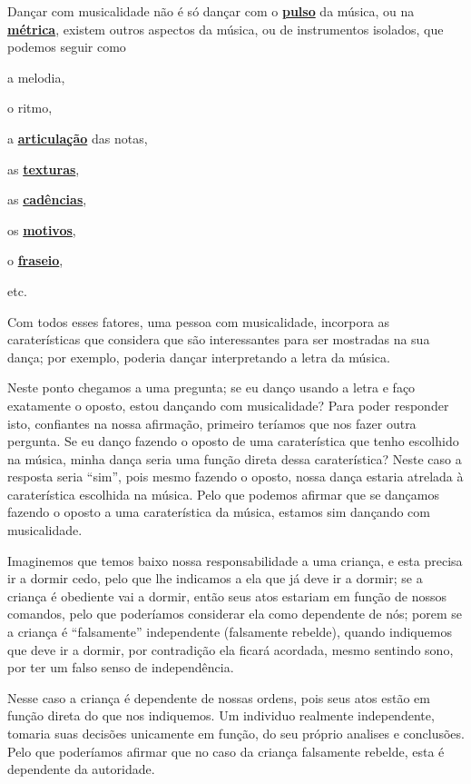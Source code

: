 Dançar com musicalidade não é só dançar com o \hyperref[ref:Pulso]{\textbf{pulso}} da música, 
ou na \hyperref[def:Metrica]{\textbf{métrica}},
existem outros aspectos da música, ou de instrumentos isolados, que podemos seguir como 
\begin{inparaitem} 
\item a melodia, 
\item o ritmo,
\item a \hyperref[sub:Articulation]{\textbf{articulação}} das notas, 
\item as \hyperref[sec:texturasmusica]{\textbf{texturas}}, 
\item as \hyperref[sec:Cadencia]{\textbf{cadências}}, 
\item os \hyperref[sec:Motivo]{\textbf{motivos}}, 
\item o \hyperref[sec:fraseio]{\textbf{fraseio}}, 
\item etc.
\end{inparaitem} 
Com todos esses fatores, uma pessoa com musicalidade, 
incorpora as caraterísticas que considera que são interessantes para 
ser mostradas na sua dança; por exemplo, poderia dançar interpretando a letra da música.

Neste ponto chegamos a uma pregunta; se eu danço usando a letra e faço exatamente o oposto,
estou dançando com musicalidade?
Para poder responder isto, confiantes na nossa afirmação,
primeiro teríamos que nos fazer outra pergunta.
Se eu danço fazendo o oposto de uma caraterística que tenho escolhido na música,
minha dança seria uma função direta dessa caraterística?
Neste caso a resposta seria ``sim'', pois mesmo fazendo o oposto,
nossa dança estaria atrelada à caraterística escolhida na música.
Pelo que podemos afirmar que se dançamos fazendo o oposto a uma caraterística da música, 
estamos sim dançando com musicalidade.
\begin{example}
Imaginemos que temos baixo nossa responsabilidade a uma criança,
e esta precisa ir a dormir cedo, pelo que lhe indicamos a ela que já deve ir a dormir;
se a criança é obediente vai a dormir, então seus atos estariam em função de nossos comandos,
pelo que poderíamos considerar ela como dependente de nós;
porem se a criança é ``falsamente'' independente (falsamente rebelde), quando indiquemos que deve ir a dormir,
por contradição ela ficará acordada, mesmo sentindo sono, por ter um falso senso de independência.

Nesse caso a criança é dependente de nossas ordens,
pois seus atos estão em função direta do que nos indiquemos.
Um individuo realmente independente, tomaria suas decisões unicamente em função,
do seu próprio analises e conclusões.
Pelo que poderíamos afirmar que no caso da criança falsamente rebelde, esta é dependente da autoridade.
\end{example}

